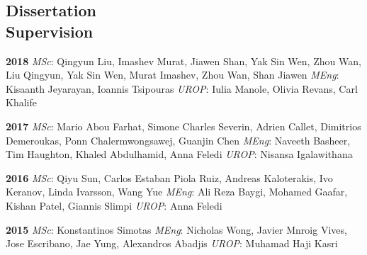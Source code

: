 \documentclass[margin]{res}
\begin{document}
\begin{resume}
\vspace{-0.15in}
\section{\sc Dissertation \\ Supervision}
\vspace{0.15in}
	\parskip=0in
	\hangindent=0.45in
	{\bf2018 }
		\textit{MSc}: Qingyun Liu, Imashev Murat, Jiawen Shan, Yak Sin Wen, Zhou Wan, Liu Qingyun, Yak Sin Wen, Murat Imashev, Zhou Wan, Shan Jiawen 
			{}
		\textit{MEng}: Kisaanth Jeyarayan, Ioannis Tsipouras 
			{ }
		\textit{UROP}: Iulia Manole, Olivia Revans, Carl Khalife 
	\par
	\parskip=0in
	\hangindent=0.45in
	{\bf2017 }
		\textit{MSc}: Mario Abou Farhat, Simone Charles Severin, Adrien Callet, Dimitrios Demeroukas, Ponn Chalermwongsawej, Guanjin Chen 
			{}
		\textit{MEng}: Naveeth Basheer, Tim Haughton, Khaled Abdulhamid, Anna Feledi 
			{ }
		\textit{UROP}: Nisansa Igalawithana 
	\par
	\parskip=0in
	\hangindent=0.45in
	{\bf2016 }
		\textit{MSc}: Qiyu Sun, Carlos Estaban Piola Ruiz, Andreas Kaloterakis, Ivo Keranov, Linda Ivarsson, Wang Yue 
			{}
		\textit{MEng}: Ali Reza Baygi, Mohamed Gaafar, Kishan Patel, Giannis Slimpi 
			{ }
		\textit{UROP}: Anna Feledi 
	\par
	\parskip=0in
	\hangindent=0.45in
	{\bf2015 }
		\textit{MSc}: Konstantinos Simotas 
			{}
		\textit{MEng}: Nicholas Wong, Javier Mnroig Vives, Jose Escribano, Jae Yung, Alexandros Abadjis 
			{ }
		\textit{UROP}: Muhamad Haji Kasri 
	\par
	\parskip=0in
	\hangindent=0.45in

\end{resume}
\end{document}
